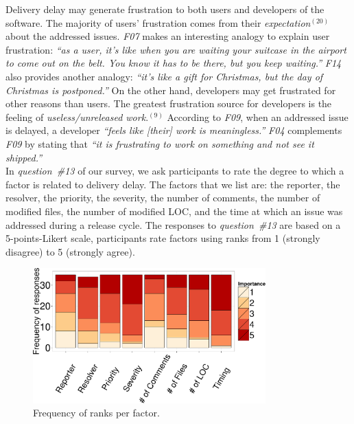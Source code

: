 \begin{sloppypar}
\noindent{} Delivery delay may generate
frustration to both users and developers of the software. The majority of users'
frustration comes from their {\em expectation}$^{(20)}$ about the addressed
issues. {\em F07} makes an interesting analogy to explain user frustration: {\em
``as a user, it's like when you are waiting your suitcase in the airport to
come out on the belt. You know it has to be there, but you keep waiting.''}
{\em F14} also provides another analogy: {\em ``it's like a gift for Christmas,
but the day of Christmas is postponed.''} On the other hand, developers may get
frustrated for other reasons than users. The greatest frustration source for
developers is the feeling of {\em useless/unreleased work}.$^{(9)}$ According to
{\em F09}, when an addressed issue is delayed, a developer {\em ``feels like
[their] work is meaningless.''} {\em F04} complements {\em F09} by stating that
{\em ``it is frustrating to work on something and not see it shipped.''} \\

\noindent{} In {\em
question~\#13} of our survey, we ask participants to rate the degree to which a
factor is related to delivery delay. The factors that we list are: the
reporter, the resolver, the priority, the severity, the number of comments, the
number of modified files, the number of modified LOC, and the time at which an
issue was addressed during a release cycle. The responses to {\em question~\#13}
are based on a 5-points-Likert scale, \ie participants rate factors using ranks from 1
(strongly disagree) to 5 (strongly agree). 

\begin{figure}
	\centering
	\includegraphics[width=0.80\textwidth,keepaspectratio]
	{chapters/chapter5/figures/rank_frequency.pdf}
	\caption{Frequency of ranks per factor.}
	\label{fig:rank_frequency}
\end{figure}


\end{sloppypar}
